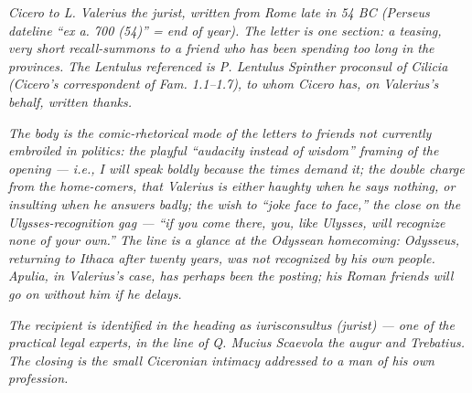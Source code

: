 
\textit{Cicero to L. Valerius the jurist, written from Rome
late in 54 BC (Perseus dateline ``ex a. 700 (54)'' = end of
year). The letter is one section: a teasing, very short
recall-summons to a friend who has been spending too long in
the provinces. The Lentulus referenced is P. Lentulus Spinther
proconsul of Cilicia (Cicero's correspondent of Fam. 1.1--1.7),
to whom Cicero has, on Valerius's behalf, written thanks.}

\textit{The body is the comic-rhetorical mode of the letters
to friends not currently embroiled in politics: the playful
``audacity instead of wisdom'' framing of the opening ---
i.e., I will speak boldly because the times demand it; the
double charge from the home-comers, that Valerius is either
haughty when he says nothing, or insulting when he answers
badly; the wish to ``joke face to face,'' the close on the
Ulysses-recognition gag --- ``if you come there, you, like
Ulysses, will recognize none of your own.'' The line is a
glance at the Odyssean homecoming: Odysseus, returning to
Ithaca after twenty years, was not recognized by his own
people. Apulia, in Valerius's case, has perhaps been the
posting; his Roman friends will go on without him if he
delays.}

\textit{The recipient is identified in the heading as
\textit{iurisconsultus} (jurist) --- one of the practical
legal experts, in the line of Q. Mucius Scaevola the augur and
Trebatius. The closing is the small Ciceronian intimacy
addressed to a man of his own profession.}
